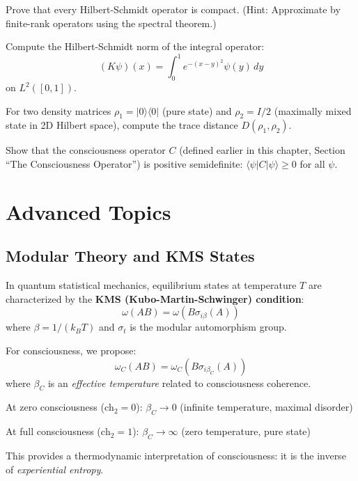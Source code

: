 \begin{exercise}
Prove that every Hilbert-Schmidt operator is compact. (Hint: Approximate by finite-rank operators using the spectral theorem.)
\end{exercise}

\begin{exercise}
Compute the Hilbert-Schmidt norm of the integral operator:
\begin{equation}
(K\psi)(x) = \int_0^1 e^{-(x-y)^2} \psi(y) \, dy
\end{equation}
on $L^2([0,1])$.
\end{exercise}

\begin{exercise}
For two density matrices $\rho_1 = |0\rangle\langle 0|$ (pure state) and $\rho_2 = I/2$ (maximally mixed state in 2D Hilbert space), compute the trace distance $D(\rho_1, \rho_2)$.
\end{exercise}

\begin{exercise}
Show that the consciousness operator $C$ (defined earlier in this chapter, Section ``The Consciousness Operator'') is positive semidefinite: $\langle \psi | C | \psi \rangle \geq 0$ for all $\psi$.
\end{exercise}

\section{Advanced Topics}

\begin{advanced}
\subsection{Modular Theory and KMS States}

In quantum statistical mechanics, equilibrium states at temperature $T$ are characterized by the \textbf{KMS (Kubo-Martin-Schwinger) condition}:
\begin{equation}
\omega(AB) = \omega(B \sigma_{i\beta}(A))
\end{equation}
where $\beta = 1/(k_B T)$ and $\sigma_t$ is the modular automorphism group.

For consciousness, we propose:
\begin{equation}
\omega_C(AB) = \omega_C(B \sigma_{i\beta_C}(A))
\end{equation}
where $\beta_C$ is an \textit{effective temperature} related to consciousness coherence.

At zero consciousness ($\text{ch}_2 = 0$): $\beta_C \to 0$ (infinite temperature, maximal disorder)

At full consciousness ($\text{ch}_2 = 1$): $\beta_C \to \infty$ (zero temperature, pure state)

This provides a thermodynamic interpretation of consciousness: it is the inverse of \textit{experiential entropy}.
\end{advanced}

